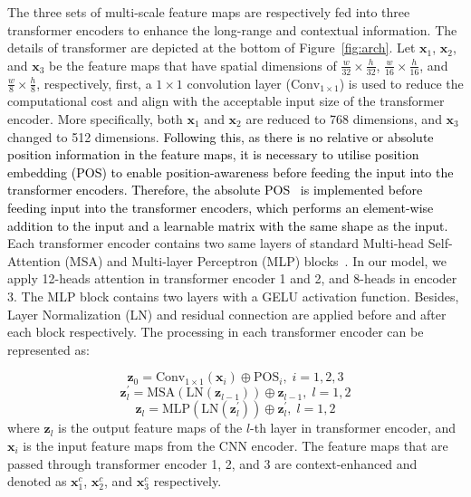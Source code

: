 \documentclass{article}
\begin{document}
The three sets of multi-scale feature maps are respectively fed into three transformer encoders to enhance the long-range and contextual information. The details of transformer are depicted at the bottom of Figure~\ref{fig:arch}. 
Let $\textbf{x}_{1}$, $\textbf{x}_{2}$, and $\textbf{x}_{3}$ be the feature maps that have spatial dimensions of $\frac{w}{32}\times\frac{h}{32}$, $\frac{w}{16}\times\frac{h}{16}$, and $\frac{w}{8}\times\frac{h}{8}$, respectively, 
first, a $1\times1$ convolution layer ($\text{Conv}_{1\times1}$) is used to reduce the computational cost and align with the acceptable input size of the transformer encoder. 
More specifically, both $\textbf{x}_{1}$ and $\textbf{x}_{2}$ are reduced to 768 dimensions, and $\textbf{x}_{3}$ changed to 512 dimensions. 
\textcolor{black}{Following this, as there is no relative or absolute position information in the feature maps, it is necessary to utilise position embedding (POS) to enable position-awareness before feeding the input into the transformer encoders. Therefore, the absolute POS~\cite{ViT} is implemented before feeding input into the transformer encoders, which performs an element-wise addition to the input and a learnable matrix with the same shape as the input.}
Each transformer encoder contains two same layers of 
standard Multi-head Self-Attention (MSA) and Multi-layer Perceptron (MLP) blocks~\cite{ViT}. 
In our model, we apply 12-heads attention in transformer encoder 1 and 2, and 8-heads in encoder 3.
The MLP block contains two layers with a GELU activation function. Besides, Layer Normalization (LN) and residual connection are applied before and after each block respectively. 
The processing in each transformer encoder can be represented as:


\begin{equation}
\textbf{z}_{0} =\text{Conv}_{1\times1}(\textbf{x}_{i}) \oplus \text{POS}_{i},\; i = 1,2,3
\end{equation}
\begin{equation}
\textbf{z}^{'}_{l} = \text{MSA}(\text{LN}(\textbf{z}_{l-1})) \oplus \textbf{z}_{l-1},\; l = 1,2
\end{equation}
\begin{equation}
\textbf{z}_{l} = \text{MLP}(\text{LN}(\textbf{z}^{'}_{l})) \oplus \textbf{z}^{'}_{l}, \; l = 1,2
\end{equation}
where $\textbf{z}_{l}$ is the output feature maps of the $l$-th layer in transformer encoder, and $\textbf{x}_i$ is the input feature maps from the CNN encoder. 
The feature maps that are passed through transformer encoder 1, 2, and 3 are context-enhanced and denoted as $\textbf{x}^{c}_{1}$, $\textbf{x}^{c}_{2}$, and $\textbf{x}^{c}_{3}$ respectively.
\end{document}
